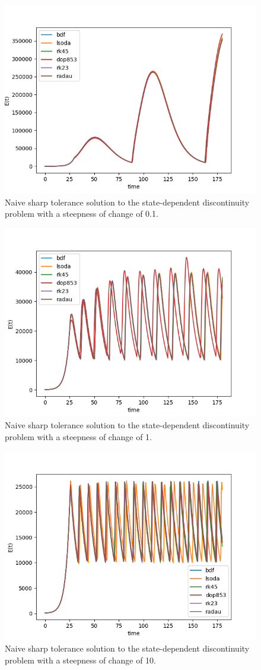 \begin{figure}[H]
\centering
\includegraphics[width=0.7\linewidth]{./figures/exp_state_naive_sharp_0_1}
\caption{Naive sharp tolerance solution to the state-dependent discontinuity problem with a steepness of change of 0.1.}
\label{fig:exp_state_naive_sharp_0_1}
\end{figure}


\begin{figure}[H]
\centering
\includegraphics[width=0.7\linewidth]{./figures/exp_state_naive_sharp_1}
\caption{Naive sharp tolerance solution to the state-dependent discontinuity problem with a steepness of change of 1.}
\label{fig:exp_state_naive_sharp_1}
\end{figure}

\begin{figure}[H]
\centering
\includegraphics[width=0.7\linewidth]{./figures/exp_state_naive_sharp_10}
\caption{Naive sharp tolerance solution to the state-dependent discontinuity problem with a steepness of change of 10.}
\label{fig:exp_state_naive_sharp_10}
\end{figure}


